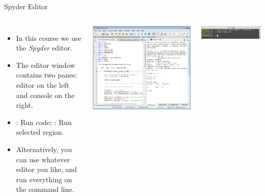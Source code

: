 \documentclass[10pt, aspectratio=169]{beamer} %
\begin{document}
\begin{frame}[fragile]{Spyder Editor}
\begin{columns}%
\begin{itemize}
\item In this course we use the \emph{Spyder} editor.
\item The editor window contains two panes: editor on the left and
console on the right.
\item {}: Run code; : Run selected region.
\item Alternatively, you can use whatever editor you like, and run
everything on the command line.
\end{itemize}
\vspace*{-0.5cm}
\includegraphics[width=1\columnwidth]{spyder.png}\\
\vspace*{0.2cm}
\centerline{\includegraphics[width=0.8\columnwidth]{helloworld.png}}
\end{columns}
\end{frame}
\end{document}
